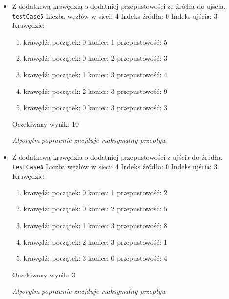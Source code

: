 \begin{itemize}[nosep]
    \item Z dodatkową krawędzią o dodatniej przepustowości ze źródła do ujścia.
    \texttt{testCase5}
    Liczba węzłów w sieci: 4
    Indeks źródła: 0
    Indeks ujścia: 3
    Krawędzie:
    \begin{enumerate}[nosep]
        \item krawędź:
        początek: 0
        koniec: 1
        przepustowość: 5
        \item krawędź:
        początek: 0
        koniec: 2
        przepustowość: 3
        \item krawędź:
        początek: 1
        koniec: 3
        przepustowość: 4
        \item krawędź:
        początek: 2
        koniec: 3
        przepustowość: 9
        \item krawędź:
        początek: 0
        koniec: 3
        przepustowość: 3
    \end{enumerate}
    Oczekiwany wynik: 10

    \emph{Algorytm
    poprawnie znajduje maksymalny przepływ.}

    \item Z dodatkową krawędzia o dodatniej przepustowości z ujścia do źródła.
    \texttt{testCase6}
    Liczba węzłów w sieci: 4
    Indeks źródła: 0
    Indeks ujścia: 3
    Krawędzie:
    \begin{enumerate}[nosep]
        \item krawędź:
        początek: 0
        koniec: 1
        przepustowość: 2
        \item krawędź:
        początek: 0
        koniec: 2
        przepustowość: 5
        \item krawędź:
        początek: 1
        koniec: 3
        przepustowość: 8
        \item krawędź:
        początek: 2
        koniec: 3
        przepustowość: 1
        \item krawędź:
        początek: 3
        koniec: 0
        przepustowość: 4
    \end{enumerate}
    Oczekiwany wynik: 3

    \emph{Algorytm poprawnie znajduje maksymalny przepływ.}


\end{itemize}
